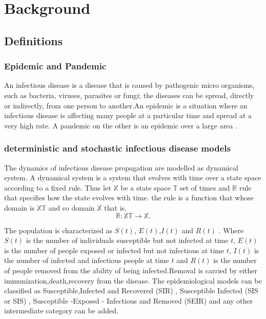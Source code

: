\chapter{Background}

\section{Definitions}
\subsection{Epidemic and Pandemic }
An infectious disease is a disease that is caused by pathogenic micro organisms, such as bacteria, viruses, parasites or fungi; the diseases can be spread, directly or indirectly, from one person to another.An  epidemic is a situation where an infectious disease is affecting many people at a particular time and spread at a very high rate. A pandemic on the other is an epidemic over a large area \citep{morens2009pandemic}.

\subsection{deterministic and stochastic infectious disease models}
The dynamics of infectious disease propagation are modelled as dynamical system. A dynamical system is a system that evolves with time over a state space according to a fixed rule. Thus let $\mathbb{X}$ be a state space $\mathbb{T}$ set of times and $\mathbb{R}$ rule that specifies how the state evolves with time. the rule is a function that whose domain is $\mathbb{X} \mathbb{T}$ and co domain $\mathbb{X}$ that is,
\begin{equation*}
\mathbb{R}: \mathbb{X} \mathbb{T} \longrightarrow \mathbb{X}.
\end{equation*}

The population is characterized as $S(t)$, $E(t)$,$I(t)$ and $R(t)$ . Where $S(t)$ is the number of individuals susceptible but not infected at time $t$, $E(t)$ is the number of people exposed or infected but not infectious at time $t$, $I(t)$ is the number of infected and infectious people at time $t$ and $R(t)$ is the number of people removed from the ability of being infected.Removal is carried by either immunization,death,recovery from the disease. The epidemiological models can be classified as Susceptible,Infected and Recovered (SIR) , Susceptible Infected (SIS or SIS) , Susceptible -Exposed - Infectious and Removed (SEIR)  and any other intermediate category can be added.

